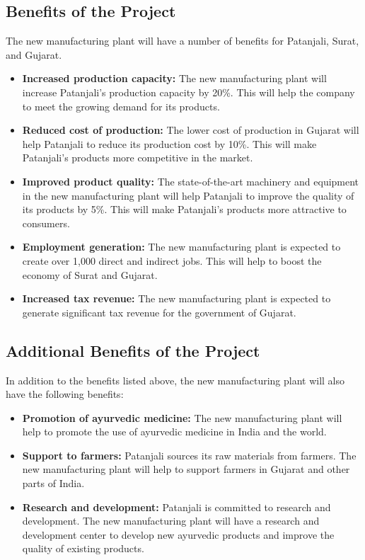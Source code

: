 \subsection{Benefits of the Project}
The new manufacturing plant will have a number of benefits for Patanjali, Surat, and Gujarat.
\begin{itemize}
    \item \textbf{Increased production capacity:} The new manufacturing plant will increase Patanjali's production capacity by 20\%. This will help the company to meet the growing demand for its products.
    \item \textbf{Reduced cost of production:} The lower cost of production in Gujarat will help Patanjali to reduce its production cost by 10\%. This will make Patanjali's products more competitive in the market.
    \item \textbf{Improved product quality:} The state-of-the-art machinery and equipment in the new manufacturing plant will help Patanjali to improve the quality of its products by 5\%. This will make Patanjali's products more attractive to consumers.
    \item \textbf{Employment generation:} The new manufacturing plant is expected to create over 1,000 direct and indirect jobs. This will help to boost the economy of Surat and Gujarat.
    \item \textbf{Increased tax revenue:} The new manufacturing plant is expected to generate significant tax revenue for the government of Gujarat.
\end{itemize}

\subsection{Additional Benefits of the Project}
In addition to the benefits listed above, the new manufacturing plant will also have the following benefits:
\begin{itemize}
    \item \textbf{Promotion of ayurvedic medicine:} The new manufacturing plant will help to promote the use of ayurvedic medicine in India and the world.
    \item \textbf{Support to farmers:} Patanjali sources its raw materials from farmers. The new manufacturing plant will help to support farmers in Gujarat and other parts of India.
    \item \textbf{Research and development:} Patanjali is committed to research and development. The new manufacturing plant will have a research and development center to develop new ayurvedic products and improve the quality of existing products.
\end{itemize}

